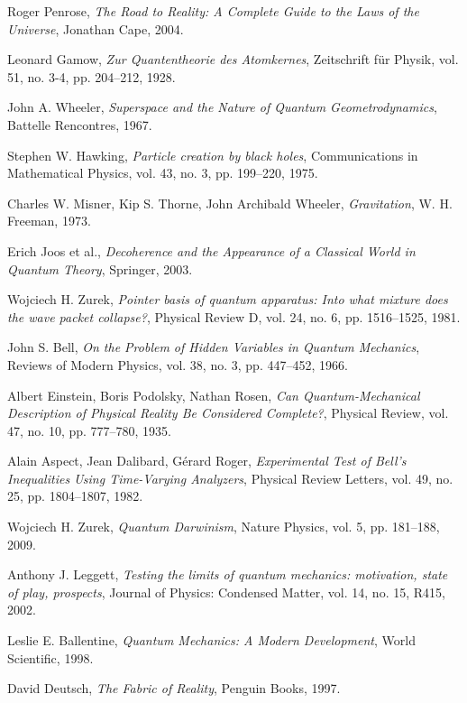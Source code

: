 \documentclass[12pt]{article}
\begin{document}
\begin{thebibliography}{999}
Roger Penrose,
\textit{The Road to Reality: A Complete Guide to the Laws of the Universe},
Jonathan Cape, 2004.

Leonard Gamow,
\textit{Zur Quantentheorie des Atomkernes},
Zeitschrift für Physik, vol. 51, no. 3-4, pp. 204–212, 1928.

John A. Wheeler,
\textit{Superspace and the Nature of Quantum Geometrodynamics},
Battelle Rencontres, 1967.

Stephen W. Hawking,
\textit{Particle creation by black holes},
Communications in Mathematical Physics, vol. 43, no. 3, pp. 199–220, 1975.

Charles W. Misner, Kip S. Thorne, John Archibald Wheeler,
\textit{Gravitation},
W. H. Freeman, 1973.

Erich Joos et al.,
\textit{Decoherence and the Appearance of a Classical World in Quantum Theory},
Springer, 2003.

Wojciech H. Zurek,
\textit{Pointer basis of quantum apparatus: Into what mixture does the wave packet collapse?},
Physical Review D, vol. 24, no. 6, pp. 1516–1525, 1981.

John S. Bell,
\textit{On the Problem of Hidden Variables in Quantum Mechanics},
Reviews of Modern Physics, vol. 38, no. 3, pp. 447–452, 1966.

Albert Einstein, Boris Podolsky, Nathan Rosen,
\textit{Can Quantum-Mechanical Description of Physical Reality Be Considered Complete?},
Physical Review, vol. 47, no. 10, pp. 777–780, 1935.

Alain Aspect, Jean Dalibard, Gérard Roger,
\textit{Experimental Test of Bell's Inequalities Using Time-Varying Analyzers},
Physical Review Letters, vol. 49, no. 25, pp. 1804–1807, 1982.

Wojciech H. Zurek,
\textit{Quantum Darwinism},
Nature Physics, vol. 5, pp. 181–188, 2009.

Anthony J. Leggett,
\textit{Testing the limits of quantum mechanics: motivation, state of play, prospects},
Journal of Physics: Condensed Matter, vol. 14, no. 15, R415, 2002.

Leslie E. Ballentine,
\textit{Quantum Mechanics: A Modern Development},
World Scientific, 1998.

David Deutsch,
\textit{The Fabric of Reality},
Penguin Books, 1997.


\end{thebibliography}
\end{document}
